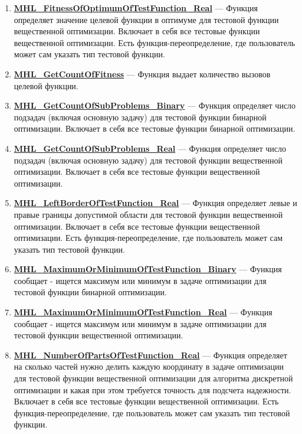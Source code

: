 \documentclass[a4paper,12pt]{article}
\begin{document}
\begin{enumerate}
\item \textbf{\hyperref[MHL_FitnessOfOptimumOfTestFunction_Real]{MHL\_FitnessOfOptimumOfTestFunction\_Real}} --- Функция определяет значение целевой функции в оптимуме для тестовой функции вещественной оптимизации. Включает в себя все тестовые функции вещественной оптимизации. Есть функция-переопределение, где пользователь может сам указать тип тестовой функции.

\item \textbf{\hyperref[MHL_GetCountOfFitness]{MHL\_GetCountOfFitness}} --- Функция выдает количество вызовов целевой функции.

\item \textbf{\hyperref[MHL_GetCountOfSubProblems_Binary]{MHL\_GetCountOfSubProblems\_Binary}} --- Функция определяет число подзадач (включая основную задачу) для тестовой функции бинарной оптимизации. Включает в себя все тестовые функции бинарной оптимизации.

\item \textbf{\hyperref[MHL_GetCountOfSubProblems_Real]{MHL\_GetCountOfSubProblems\_Real}} --- Функция определяет число подзадач (включая основную задачу) для тестовой функции вещественной оптимизации. Включает в себя все тестовые функции вещественной оптимизации.

\item \textbf{\hyperref[MHL_LeftBorderOfTestFunction_Real]{MHL\_LeftBorderOfTestFunction\_Real}} --- Функция определяет левые и правые границы допустимой области для тестовой функции вещественной оптимизации. Включает в себя все тестовые функции вещественной оптимизации. Есть функция-переопределение, где пользователь может сам указать тип тестовой функции.

\item \textbf{\hyperref[MHL_MaximumOrMinimumOfTestFunction_Binary]{MHL\_MaximumOrMinimumOfTestFunction\_Binary}} --- 	Функция сообщает - ищется максимум или минимум в задаче оптимизации для тестовой функции бинарной оптимизации.

\item \textbf{\hyperref[MHL_MaximumOrMinimumOfTestFunction_Real]{MHL\_MaximumOrMinimumOfTestFunction\_Real}} --- 	Функция сообщает - ищется максимум или минимум в задаче оптимизации для тестовой функции вещественной оптимизации.

\item \textbf{\hyperref[MHL_NumberOfPartsOfTestFunction_Real]{MHL\_NumberOfPartsOfTestFunction\_Real}} --- Функция определяет на сколько частей нужно делить каждую координату в задаче оптимизации для тестовой функции вещественной оптимизации для алгоритма дискретной оптимизации и какая при этом требуется точность для подсчета надежности. Включает в себя все тестовые функции вещественной оптимизации. Есть функция-переопределение, где пользователь может сам указать тип тестовой функции.


\end{enumerate}
\end{document}
